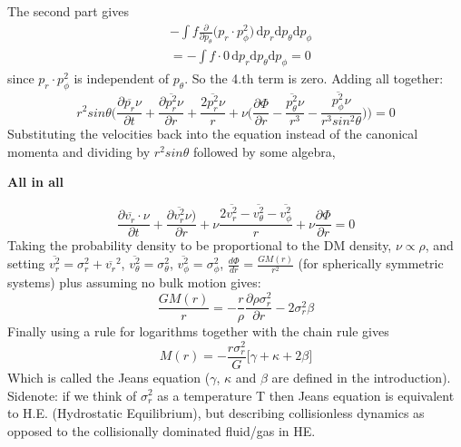The second part gives
\begin{equation}
\begin{aligned}
&- \int \! f\frac{\partial}{\partial p_{\theta}} \Bigg( p_r \cdot p_{\phi}^2 \Bigg) \, \mathrm{d}p_r \mathrm{d}p_{\theta} \mathrm{d}p_{\phi} \\
&= - \int \! f\cdot 0 \, \mathrm{d}p_r \mathrm{d}p_{\theta} \mathrm{d}p_{\phi} = 0
\end{aligned}
\end{equation}
since $ p_r \cdot p_{\phi}^2 $ is independent of $ p_{\theta}$.
So the 4.th term is zero. Adding all together:
\begin{equation}
r^2 sin \theta \Big( \frac{\partial \overline{p_r} \nu}{\partial t} +
\frac{\partial \overline{p_r^2} \nu}{\partial r} +
\frac{2 \overline{p_r^2} \nu}{r} +
\nu \Big( \frac{\partial \Phi}{\partial r} -
\frac{\overline{p_{\theta}^2} \nu}{r^3} -
\frac{\overline{p_{\phi}^2} \nu}{r^3 sin^2 \theta}
\Big) \Big)  = 0
\end{equation}
Substituting the velocities back into the equation instead of the canonical momenta
and dividing by $r^2 sin \theta$ followed by some algebra,

\centerline{\textbf{All in all}}

\begin{equation}
\frac{\partial \overline{v_r}\cdot \nu}{\partial t} +
\frac{\partial \overline{v_r^2} \nu)}{\partial r} + 
\nu \frac{2 \overline{v_r^2} - \overline{v_{\theta}^2} - \overline{v_{\phi}^2}}{r} +
\nu \frac{\partial \Phi}{\partial r} = 0
\end{equation}
Taking the probability density to be proportional to the DM density, $\nu \propto \rho$, and setting 
$\overline{v_r^2} = \sigma_r^2 + \overline{v_r}^2$, $\overline{v_{\theta}^2} = \sigma_{\theta}^2$, 
$\overline{v_{\phi}^2} = \sigma_{\phi}^2$, $\frac{d \Phi}{dr} = \frac{GM(r)}{r^2}$ (for spherically symmetric systems) plus assuming no bulk motion gives:
\begin{equation}
\frac{GM(r)}{r} = -\frac{r}{\rho} \frac{\partial \rho \sigma_r^2}{\partial r} - 2\sigma_r^2\beta
\end{equation}
Finally using a rule for logarithms together with the chain rule gives
\begin{equation}
M(r) = -\frac{r \sigma_r^2}{G}  \Bigg[\gamma +\kappa +2 \beta \Bigg] 
\end{equation}
Which is called the Jeans equation ($\gamma$, $\kappa$ and $\beta$ are defined in the introduction). 
Sidenote: if we think of $\sigma_r^2$ as a temperature T then Jeans equation is equivalent to H.E. (Hydrostatic Equilibrium), but describing collisionless dynamics as opposed to the collisionally dominated fluid/gas in HE.